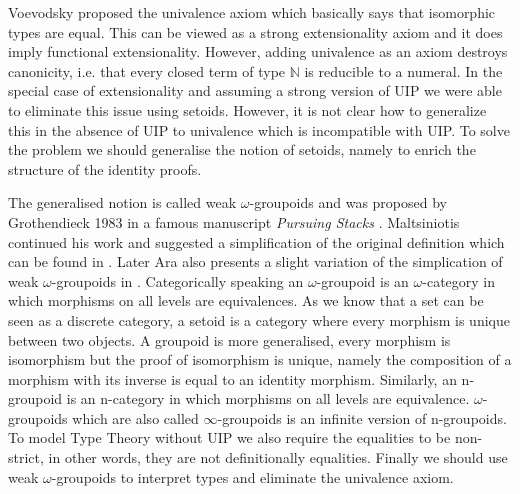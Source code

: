 \documentclass{acm_proc_article-sp}
\newcommand{\og}{$\omega$-groupoids}
\newcommand{\wog}{weak $\omega$-groupoids}
\begin{document}
Voevodsky proposed the univalence axiom which basically says that
isomorphic types are equal. This can be viewed as a strong
extensionality axiom and it does imply functional extensionality.
However, adding
univalence as an axiom destroys canonicity, i.e. that every closed
term of type $\mathbb{N}$ is reducible to a numeral. In the special case of
extensionality and assuming a strong version of UIP we were able to
eliminate this issue \cite{alti:lics99,alti:ott-conf} using
setoids. However, it is not clear how to generalize this in the
absence of UIP to
univalence which is incompatible with UIP.  To solve the problem we
should generalise the notion of setoids, namely to enrich the
structure of the identity proofs.


The generalised notion is called {\wog} and was proposed by
Grothendieck 1983 in a famous manuscript \emph{Pursuing Stacks} \cite{gro:ps}. Maltsiniotis continued his work and suggested a simplification of the original definition which can be found in \cite{mal:gwog}. Later Ara also presents a slight variation of the simplication of {\wog} in \cite{ara:wog}. Categorically speaking an $\omega$-groupoid is an $\omega$-category in which morphisms on all levels are equivalences. As we know that a set can be seen as a discrete
category, a setoid is a category where every morphism is unique between
two objects. A groupoid is more generalised, every morphism is
isomorphism but the proof of isomorphism is unique, namely the composition of a morphism with its inverse is equal to an identity morphism. Similarly, an
n-groupoid is an n-category in which morphisms on all levels are
equivalence. {\og} which are also called $\infty$-groupoids is an
infinite version of n-groupoids. To model Type Theory without UIP we
also require the equalities to be non-strict, in other words, they are
not definitionally equalities. Finally we should use {\wog} to interpret types and eliminate the univalence axiom.
\end{document}
